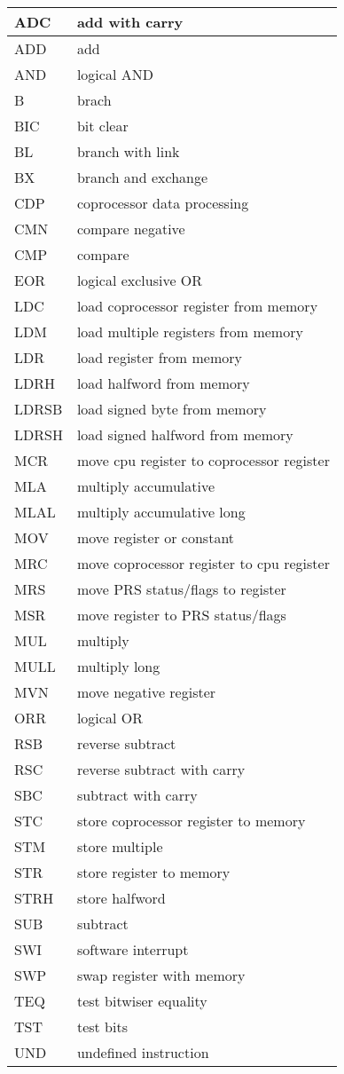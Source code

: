 \begin{longtable}{|l|l|}
\hline
ADC	& add with carry \\
\hline
ADD	& add \\
\hline
AND	& logical AND \\
\hline
B	& brach \\
\hline
BIC	& bit clear \\
\hline
BL	& branch with link \\
\hline
BX	& branch and exchange \\
\hline
CDP	& coprocessor data processing \\
\hline
CMN & compare negative \\
\hline
CMP & compare \\
\hline
EOR	& logical exclusive OR \\
\hline
LDC	& load coprocessor register from memory \\
\hline
LDM	& load multiple registers from memory \\
\hline
LDR	& load register from memory \\
\hline
LDRH	& load halfword from memory \\
\hline
LDRSB	& load signed byte from memory \\
\hline
LDRSH	& load signed halfword from memory \\
\hline
MCR	& move cpu register to coprocessor register \\
\hline
MLA	& multiply accumulative \\
\hline
MLAL & multiply accumulative long \\
\hline
MOV	& move register or constant \\
\hline
MRC	& move coprocessor register to cpu register \\
\hline
MRS	& move PRS status/flags to register \\
\hline
MSR	& move register to PRS status/flags \\
\hline
MUL	& multiply \\
\hline
MULL & multiply long \\
\hline
MVN	& move negative register \\
\hline
ORR	& logical OR \\
\hline
RSB	& reverse subtract \\
\hline
RSC	& reverse subtract with carry \\
\hline
SBC	& subtract with carry \\
\hline
STC	& store coprocessor register to memory \\
\hline
STM	& store multiple \\
\hline
STR	& store register to memory \\
\hline
STRH & store halfword \\
\hline
SUB	& subtract \\
\hline
SWI	& software interrupt \\
\hline
SWP	& swap register with memory \\
\hline
TEQ	& test bitwiser equality \\
\hline
TST	& test bits \\
\hline
UND	& undefined instruction \\
\hline
\end{longtable}
